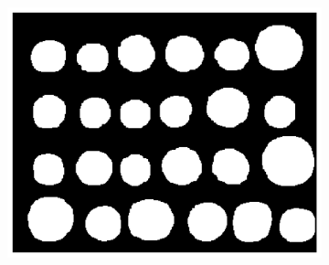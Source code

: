 \documentclass[11pt]{article}
\begin{document}
\begin{figure}[H]
\begin{subfigure}{.33\textwidth}
        \includegraphics[width=\linewidth]{figs/q1c_mask_no_small_components.png}
        \caption{}
    \end{subfigure}%


\end{figure}
\end{document}
